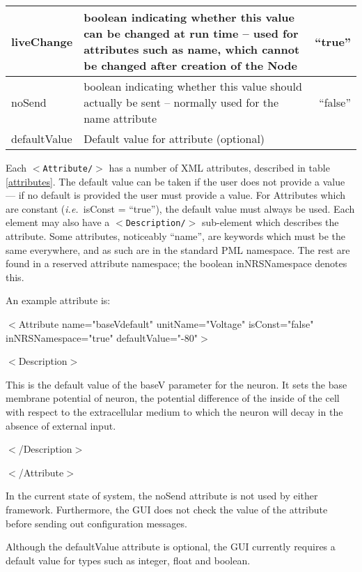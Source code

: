 \documentclass[pdftex,a4paper]{article}
\newcommand{\ie}{{\em i.e.\ }}
\newcommand{\XML}[2][]{{\tt \small $<$#2#1/$>$}}
\newcommand{\XMLtext}[1]{
  \begin{tt}
    \begin{small}
      \begin{list}{}{
          \setlength{\topsep}{0pt}
          \setlength{\partopsep}{0pt}
          \setlength{\itemsep}{0pt}
          \setlength{\parsep}{0pt}
          \setlength{\leftmargin}{2em}
          \setlength{\rightmargin}{2em}
          \setlength{\labelsep}{0pt}
        }
      \item #1
      \end{list}
    \end{small}
  \end{tt}
}
\newcommand{\XMLfull}[3][]{\XMLtext{$<$#2#1$>$
    #3
  \item $<$/#2$>$}}
\begin{document}
\begin{table}[!h]
\begin{center}
\begin{tabular}{|l|p{6cm}|r|}
      \hline

      liveChange & boolean indicating whether this value can be
      changed at run time -- used for attributes such as name, which
      cannot be changed after creation of the Node & ``true''\\

      \hline

      noSend & boolean indicating whether this value should
      actually be sent -- normally used for the name attribute &
      ``false''\\

      \hline

      defaultValue & Default value for attribute (optional) & \\

      \hline
    \end{tabular}
  \end{center}
\end{table}


Each \XML{Attribute} has a number of XML attributes, described in
table \ref{attributes}. The default value can be taken if the user
does not provide a value --- if no default is provided the user must
provide a value. For Attributes which are constant (\ie isConst =
``true''), the default value must always be used. Each element may
also have a \XML{Description} sub-element which describes the
attribute. Some attributes, noticeably ``name'', are keywords which
must be the same everywhere, and as such are in the standard PML
namespace. The rest are found in a reserved attribute namespace; the
boolean inNRSNamespace denotes this.

An example attribute is:

\XMLfull[ name="baseVdefault" unitName="Voltage"
  isConst="false" inNRSNamespace="true" defaultValue="-80"]{Attribute}{
  \XMLfull{Description}{
    \XMLtext{This is the default value of the baseV parameter for the
      neuron. It sets the base membrane potential of neuron, the
      potential difference of the inside of the cell with respect to
      the extracellular medium to which the neuron will decay in the
      absence of external input.}
  }
}

In the current state of system, the noSend attribute is not used by either
framework. Furthermore, the GUI does not check the value of the attribute before
sending out configuration messages. 

Although the defaultValue attribute is optional, the GUI currently requires a
default value for types such as integer, float and boolean.
\end{document}
